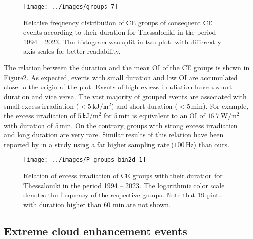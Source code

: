 \documentclass[preprint, 5p,
authoryear]{elsarticle} %
\providecommand{\DIFaddtex}[1]{{\protect\color{blue}\uwave{#1}}} %
\providecommand{\DIFdeltex}[1]{{\protect\color{red}\sout{#1}}}                      %
\providecommand{\DIFaddFL}[1]{\DIFadd{#1}} %
\providecommand{\DIFdelFL}[1]{\DIFdel{#1}} %
\providecommand{\DIFaddbeginFL}{} %
\providecommand{\DIFaddendFL}{} %
\providecommand{\DIFdelbeginFL}{} %
\providecommand{\DIFdelendFL}{} %
\providecommand{\DIFadd}[1]{\texorpdfstring{\DIFaddtex{#1}}{#1}} %
\providecommand{\DIFdel}[1]{\texorpdfstring{\DIFdeltex{#1}}{}} %
\newcommand{\DIFscaledelfig}{0.5}
\newlength{\DIFdelgraphicswidth} %
\newlength{\DIFdelgraphicsheight} %
\newcommand{\DIFaddincludegraphics}[2][]{{\color{blue}\fbox{\DIFOincludegraphics[#1]{#2}}}} %
\newcommand{\DIFdelincludegraphics}[2][]{%
\sbox{\DIFdelgraphicsbox}{\DIFOincludegraphics[#1]{#2}}%
\settoboxwidth{\DIFdelgraphicswidth}{\DIFdelgraphicsbox} %
\settoboxtotalheight{\DIFdelgraphicsheight}{\DIFdelgraphicsbox} %
\scalebox{\DIFscaledelfig}{%
\parbox[b]{\DIFdelgraphicswidth}{\usebox{\DIFdelgraphicsbox}\\[-\baselineskip] \rule{\DIFdelgraphicswidth}{0em}}\llap{\resizebox{\DIFdelgraphicswidth}{\DIFdelgraphicsheight}{%
\setlength{\unitlength}{\DIFdelgraphicswidth}%
\begin{picture}(1,1)%
\thicklines\linethickness{2pt} %
{\color[rgb]{1,0,0}\put(0,0){\framebox(1,1){}}}%
{\color[rgb]{1,0,0}\put(0,0){\line( 1,1){1}}}%
{\color[rgb]{1,0,0}\put(0,1){\line(1,-1){1}}}%
\end{picture}%
}\hspace*{3pt}}} %
} %
\DeclareRobustCommand{\DIFaddbeginFL}{\DIFOaddbeginFL \let\includegraphics\DIFaddincludegraphics} %
\DeclareRobustCommand{\DIFaddendFL}{\DIFOaddendFL \let\includegraphics\DIFOincludegraphics} %
\DeclareRobustCommand{\DIFdelbeginFL}{\DIFOdelbeginFL \let\includegraphics\DIFdelincludegraphics} %
\DeclareRobustCommand{\DIFdelendFL}{\DIFOaddendFL \let\includegraphics\DIFOincludegraphics} %
\begin{document}
\begin{figure}

{\centering \texttt{[image: ../images/groups-7]} 

}

\caption{Relative frequency distribution of CE groups of consequent CE events according to their duration for Thessaloniki in the period 1994 -- 2023. The histogram was split in two plots with different y-axis scales for better readability.}\label{fig:ceg-duration-distribution}
\end{figure}

The relation between the duration and the mean OI of the CE groups is
shown in Figure\nobreakspace{}\ref{fig:group-2d}. As expected, events
with small duration and low OI are accumulated close to the origin of
the plot. Events of high excess irradiation have a short duration and
vice versa. The vast majority of grouped events are associated with
small excess irradiation (\(<5\,\text{kJ}/\text{m}^2\)) and short
duration (\(<5\,\text{min}\)). For example, the excess irradiation of
\(5\,\text{kJ}/\text{m}^2\) for \(5\,\text{min}\) is equivalent to an OI
of \(16.7\,\text{W}/\text{m}^2\) with duration of \(5\,\text{min}\). On
the contrary, groups with strong excess irradiation and long duration
are very rare. Similar results of this relation have been reported by
\citet{Zhang2018} in a study using a far higher sampling rate
(\(100\,\text{Hz}\)) than ours.

\begin{figure}

{\centering \texttt{[image: ../images/P-groups-bin2d-1]} 

}

\caption{Relation of excess irradiation of CE groups with their duration for Thessaloniki in the period 1994 -- 2023. The logarithmic color scale denotes the frequency of the respective groups. Note that 19 \DIFdelbeginFL \DIFdelFL{pints }\DIFdelendFL \DIFaddbeginFL \DIFaddFL{points of groups }\DIFaddendFL with duration higher than 60 min are not shown.}\label{fig:group-2d}
\end{figure}

\hypertarget{extreme-cloud-enhancement-events}{%
\subsection{Extreme cloud enhancement
events}\label{extreme-cloud-enhancement-events}}
\end{document}
